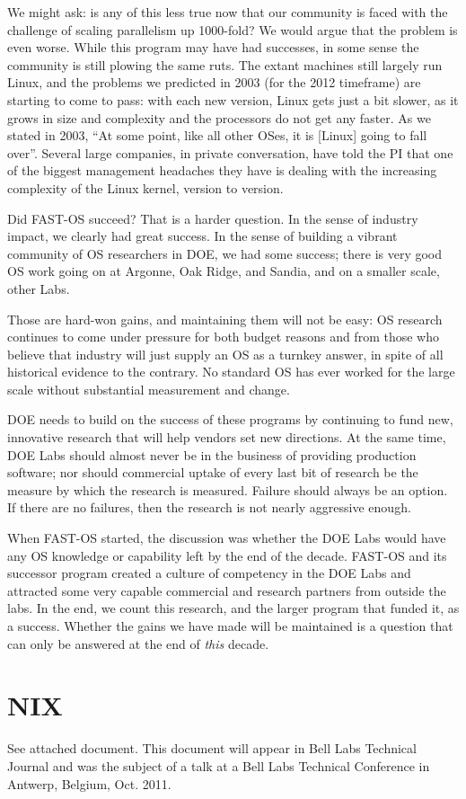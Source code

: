 \documentclass{report}
\begin{document}
We might ask: is any of this less true now that our community is faced with 
the challenge of scaling parallelism up 1000-fold? We would argue that 
the problem is even worse. While this program may have had successes, in some 
sense the community is 
still plowing the same ruts. The extant machines still largely run Linux, and the 
problems we predicted in 2003 (for the 2012 timeframe) are starting to 
come to pass: with each new version, Linux gets just a bit slower, as it grows in size 
and complexity and the processors do not get any faster. As we stated in 2003, 
``At some point, like all other OSes, it is [Linux] going to fall over''. 
Several large companies, in private conversation, have told the PI that one of the
biggest management headaches they have is dealing with the increasing complexity of 
the Linux kernel, version to version. 

Did FAST-OS succeed? That is a harder question. In the sense of industry impact, we 
clearly had great success. In the sense of building a vibrant community of OS researchers
in DOE, we had some success; there is very good OS work going on at Argonne, Oak Ridge, 
and Sandia, and on a smaller scale, other Labs. 

Those are hard-won gains, and maintaining them 
will not be easy: OS research continues to come under 
pressure for both budget reasons and 
from those who believe that industry will just supply an OS as a turnkey 
answer, in spite of all historical evidence to the contrary. No standard OS has ever worked
for the large scale without substantial measurement and change. 

DOE needs to build on the success of these programs by continuing
to fund new, innovative research that will 
help vendors set new directions. At the same time, DOE Labs should almost never be in the business of 
providing production software; nor should commercial uptake of every last bit of research be the measure 
by which the research is measured. Failure should always be an option. If there are no failures, 
then the research is not nearly aggressive enough. 

When FAST-OS started, the discussion was whether the DOE Labs would have any OS 
knowledge or capability left by the end of the decade. FAST-OS and its successor
program created a culture of competency in the DOE Labs and attracted some very 
capable commercial and research partners  from outside the labs. 
In the end, we count this research, 
and the larger program that funded it, as a success. Whether
the gains we have made will be maintained is a question that can only 
be answered at the end of {\em this} decade. 

% 




\appendix
\section{NIX}
See attached document.
This document will appear in Bell Labs Technical Journal and was the subject
of a talk at a Bell Labs Technical Conference in Antwerp, Belgium, Oct. 2011. 
\end{document}
